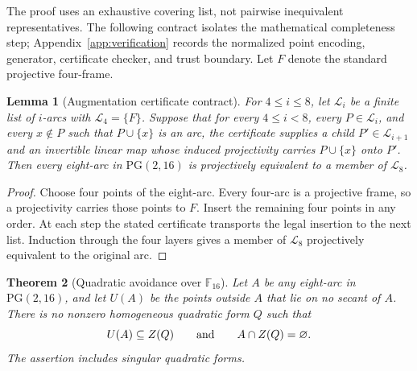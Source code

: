 \documentclass[11pt]{article}
\newtheorem{theorem}{Theorem}[section]
\newtheorem{lemma}[theorem]{Lemma}
\theoremstyle{definition}
\theoremstyle{remark}
\newcommand{\PG}{\mathrm{PG}}
\newcommand{\F}{\mathbb{F}}
\begin{document}
The proof uses an exhaustive covering list, not pairwise inequivalent
representatives.  The following contract isolates the mathematical
completeness step; Appendix~\ref{app:verification} records the normalized
point encoding, generator, certificate checker, and trust boundary.  Let
\(F\) denote the standard projective four-frame.

\begin{lemma}[Augmentation certificate contract]
\label{lem:q16-contract}
For $4\le i\le8$, let $\mathcal L_i$ be a finite list of $i$-arcs with
$\mathcal L_4=\{F\}$.  Suppose that for every $4\le i<8$, every
$P\in\mathcal L_i$, and every $x\notin P$ such that $P\cup\{x\}$ is an
arc, the certificate supplies a child $P'\in\mathcal L_{i+1}$ and an invertible
linear map whose induced projectivity carries $P\cup\{x\}$ onto $P'$.
Then every eight-arc in $\PG(2,16)$ is projectively equivalent to a member
of $\mathcal L_8$.
\end{lemma}

\begin{proof}
Choose four points of the eight-arc.  Every four-arc is a projective frame,
so a projectivity carries those points to $F$.  Insert the remaining four
points in any order.  At each step the stated certificate transports the
legal insertion to the next list.  Induction through the four layers gives
a member of $\mathcal L_8$ projectively equivalent to the original arc.
\end{proof}

\begin{theorem}[Quadratic avoidance over $\F_{16}$]
\label{thm:q16-quadratic}
Let $A$ be any eight-arc in $\PG(2,16)$, and let $U(A)$ be the points outside
$A$ that lie on no secant of $A$.  There is no nonzero homogeneous quadratic
form $Q$ such that
\[
 U(A)\subseteq Z(Q)
 \qquad\hbox{and}\qquad
 A\cap Z(Q)=\varnothing.
\]
The assertion includes singular quadratic forms.
\end{theorem}
\end{document}
